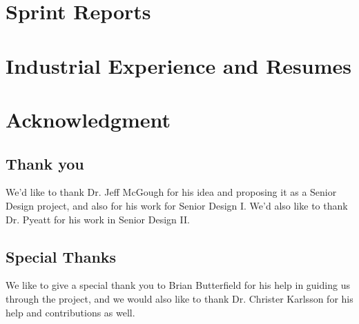 \documentclass{book}
\begin{document}
%

%

\chapter{Sprint Reports}


\chapter{Industrial Experience and Resumes}


\chapter{Acknowledgment}
\label{SpecialThanks}  

\section*{Thank you}
We'd like to thank Dr. Jeff McGough for his idea and proposing it as a Senior Design project, and also for his work for Senior Design I. We'd also like to thank Dr. Pyeatt for his work in Senior Design II.

\section*{Special Thanks}
We like to give a special thank you to Brian Butterfield for his help in guiding us through the project, and we would also like to thank Dr. Christer Karlsson for his help and contributions as well.



\backmatter
\end{document}
